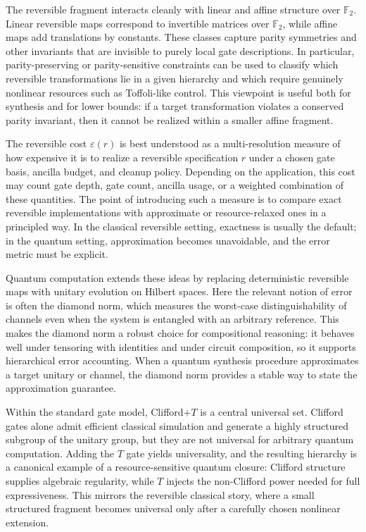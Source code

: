 \documentclass[11pt]{article}
\begin{document}
The reversible fragment interacts cleanly with linear and affine structure over \(\mathbb{F}_2\). Linear reversible maps correspond to invertible matrices over \(\mathbb{F}_2\), while affine maps add translations by constants. These classes capture parity symmetries and other invariants that are invisible to purely local gate descriptions. In particular, parity-preserving or parity-sensitive constraints can be used to classify which reversible transformations lie in a given hierarchy and which require genuinely nonlinear resources such as Toffoli-like control. This viewpoint is useful both for synthesis and for lower bounds: if a target transformation violates a conserved parity invariant, then it cannot be realized within a smaller affine fragment.

The reversible cost \(\varepsilon(r)\) is best understood as a multi-resolution measure of how expensive it is to realize a reversible specification \(r\) under a chosen gate basis, ancilla budget, and cleanup policy. Depending on the application, this cost may count gate depth, gate count, ancilla usage, or a weighted combination of these quantities. The point of introducing such a measure is to compare exact reversible implementations with approximate or resource-relaxed ones in a principled way. In the classical reversible setting, exactness is usually the default; in the quantum setting, approximation becomes unavoidable, and the error metric must be explicit.

Quantum computation extends these ideas by replacing deterministic reversible maps with unitary evolution on Hilbert spaces. Here the relevant notion of error is often the diamond norm, which measures the worst-case distinguishability of channels even when the system is entangled with an arbitrary reference. This makes the diamond norm a robust choice for compositional reasoning: it behaves well under tensoring with identities and under circuit composition, so it supports hierarchical error accounting. When a quantum synthesis procedure approximates a target unitary or channel, the diamond norm provides a stable way to state the approximation guarantee.

Within the standard gate model, Clifford\(+T\) is a central universal set. Clifford gates alone admit efficient classical simulation and generate a highly structured subgroup of the unitary group, but they are not universal for arbitrary quantum computation. Adding the \(T\) gate yields universality, and the resulting hierarchy is a canonical example of a resource-sensitive quantum closure: Clifford structure supplies algebraic regularity, while \(T\) injects the non-Clifford power needed for full expressiveness. This mirrors the reversible classical story, where a small structured fragment becomes universal only after a carefully chosen nonlinear extension.
\end{document}
